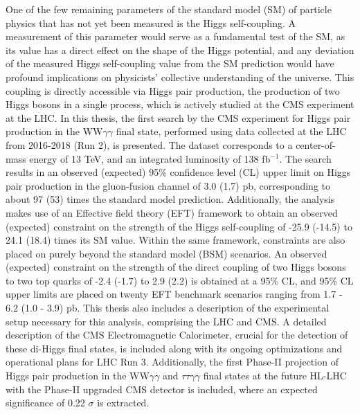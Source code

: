 One of the few remaining parameters of the standard model (SM) of particle physics that has not yet been measured is the Higgs self-coupling. A measurement of this parameter would serve as a fundamental test of the SM, as its value has a direct effect on the shape of the Higgs potential, and any deviation of the measured Higgs self-coupling value from the SM prediction would have profound implications on physicists' collective understanding of the universe. This coupling is directly accessible via Higgs pair production, the production of two Higgs bosons in a single process, which is actively studied at the CMS experiment at the LHC. In this thesis, the first search by the CMS experiment for Higgs pair production in the WW$\gamma\gamma$ final state, performed using data collected at the LHC from 2016-2018 (Run 2), is presented. The dataset corresponds to a center-of-mass energy of 13 TeV, and an integrated luminosity of 138 fb$^{-1}$. The search results in an observed (expected) 95\% confidence level (CL) upper limit on Higgs pair production in the gluon-fusion channel of 3.0 (1.7) pb, corresponding to about 97 (53) times the standard model prediction. Additionally, the analysis makes use of an Effective field theory (EFT) framework to obtain an observed (expected) constraint on the strength of the Higgs self-coupling of -25.9 (-14.5) to 24.1 (18.4) times its SM value. Within the same framework, constraints are also placed on purely beyond the standard model (BSM) scenarios. An observed (expected) constraint on the strength of the direct coupling of two Higgs bosons to two top quarks of -2.4 (-1.7) to 2.9 (2.2) is obtained at a 95\% CL, and 95\% CL upper limits are placed on twenty EFT benchmark scenarios ranging from 1.7 - 6.2 (1.0 - 3.9) pb. This thesis also includes a description of the experimental setup necessary for this analysis, comprising the LHC and CMS. A detailed description of the CMS Electromagnetic Calorimeter, crucial for the detection of these di-Higgs final states, is included along with its ongoing optimizations and operational plans for LHC Run 3. Additionally, the first Phase-II projection of Higgs pair production in the WW$\gamma\gamma$ and $\tau\tau\gamma\gamma$ final states at the future HL-LHC with the Phase-II upgraded CMS detector is included, where an expected significance of 0.22 $\sigma$ is extracted.